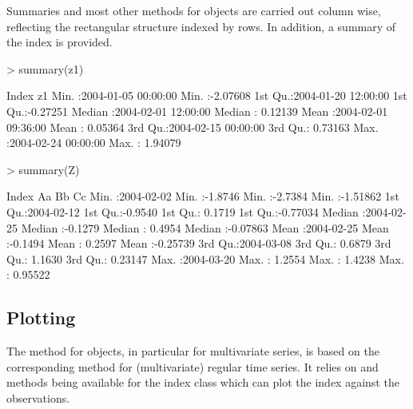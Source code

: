 \documentclass{Z}
\begin{document}
Summaries and most other methods for  objects are carried out
column wise, reflecting the rectangular structure indexed by rows. In addition,
a summary of the index is provided.

\begin{Schunk}
\begin{Sinput}
> summary(z1)
\end{Sinput}
\begin{Soutput}
     Index                           z1          
 Min.   :2004-01-05 00:00:00   Min.   :-2.07608  
 1st Qu.:2004-01-20 12:00:00   1st Qu.:-0.27251  
 Median :2004-02-01 12:00:00   Median : 0.12139  
 Mean   :2004-02-01 09:36:00   Mean   : 0.05364  
 3rd Qu.:2004-02-15 00:00:00   3rd Qu.: 0.73163  
 Max.   :2004-02-24 00:00:00   Max.   : 1.94079  
\end{Soutput}
\begin{Sinput}
> summary(Z)
\end{Sinput}
\begin{Soutput}
     Index                  Aa                Bb                Cc          
 Min.   :2004-02-02   Min.   :-1.8746   Min.   :-2.7384   Min.   :-1.51862  
 1st Qu.:2004-02-12   1st Qu.:-0.9540   1st Qu.: 0.1719   1st Qu.:-0.77034  
 Median :2004-02-25   Median :-0.1279   Median : 0.4954   Median :-0.07863  
 Mean   :2004-02-25   Mean   :-0.1494   Mean   : 0.2597   Mean   :-0.25739  
 3rd Qu.:2004-03-08   3rd Qu.: 0.6879   3rd Qu.: 1.1630   3rd Qu.: 0.23147  
 Max.   :2004-03-20   Max.   : 1.2554   Max.   : 1.4238   Max.   : 0.95522  
\end{Soutput}
\end{Schunk}

 
\subsection{Plotting}
\label{sec:plot}

The  method for  objects, in particular for
multivariate  series, is based on the corresponding
method for (multivariate) regular time series. It relies on 
and  methods being available for the index class which can
plot the index against the observations.
\end{document}
